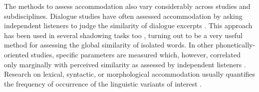 \documentclass[output=paper,
modfonts
]{langscibook}
\begin{document}
The methods to assess accommodation also vary considerably across studies and subdisciplines. Dialogue studies have often assessed accommodation by asking independent listeners to judge the similarity of dialogue excerpts \citep{pardo_phonetic_2006,kim_phonetic_2013}. This approach has been used in several shadowing tasks too \citep[e.g.][]{goldinger_echoes_1998}, turning out to be a very useful method for assessing the global similarity of isolated words. In other phonetically-oriented studies, specific parameters are measured \citep[e.g.][]{babel_dialect_2010,de_looze_investigating_2014} which, however, correlated only marginally  with perceived similarity as assessed by independent listeners \citep{pardo_phonetic_2013,walker_repeat_2015,abel_cognitive_2016,pardo_phonetic_2017}. Research on lexical, syntactic, or morphological accommodation usually quantifies the frequency of occurrence of the linguistic variants of interest \citep[e.g.][]{beckner_participants_2016,weatherholtz_socially-mediated_2014}.
% 
% 
% 
% 
% 
% 
% 
\end{document}
